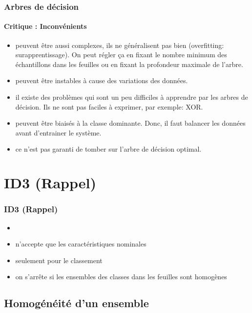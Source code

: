 \documentclass[xcolor=table]{beamer}
\begin{document}
\begin{frame}
	\frametitle{Arbres de décision}
	\framesubtitle{Critique : Inconvénients}
	
	\begin{itemize}
		\item peuvent être aussi complexes, ils ne généralisent pas bien (overfitting: surapprentissage). On peut régler ça en fixant le nombre minimum des échantillons dans les feuilles ou en fixant la profondeur maximale de l'arbre.
		\item peuvent être instables à cause des variations des données.
		\item il existe des problèmes qui sont un peu difficiles à apprendre par les arbres de décision. Ils ne sont pas faciles à exprimer, par exemple: XOR.
		\item peuvent être biaisés à la classe dominante. Donc, il faut balancer les données avant d'entrainer le système.
		\item ce n'est pas garanti de tomber sur l'arbre de décision optimal.
	\end{itemize}
	
\end{frame}

\section{ID3 (Rappel)}

\begin{frame}
	\frametitle{ID3 (Rappel)}
	
	\begin{itemize}
		\item {}
		\item n'accepte que les caractéristiques nominales
		\item seulement pour le classement
		\item on s'arrête si les ensembles des classes dans les feuilles sont homogènes
	\end{itemize}
	
\end{frame}

\subsection{Homogénéité d'un ensemble}
\end{document}
